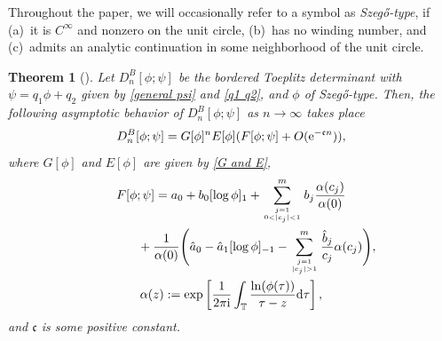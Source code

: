 \documentclass[10pt,a4paper]{amsart}
\numberwithin{equation}{section}
\newtheorem{Theorem}{Theorem}[section]
\newcommand{\T}{{\mathbb T}}
\newcommand{\al}{\alpha}
\begin{document}
\begin{Definition}
Throughout the paper, we will occasionally refer to a symbol as \textit{Szeg\H{o}-type}, if (a)~it is $C^{\infty}$ and nonzero on the unit circle, (b)~has no winding number, and (c)~admits an analytic continuation in some neighborhood of the unit circle.
\end{Definition}

\begin{Theorem}[\cite{BEGIL}]\label{main thm}
	Let $D^{B}_{n}[\phi; \psi]$ be the bordered Toeplitz determinant with $\psi=q_1 \phi + q_2$ given by \eqref{general psi} and \eqref{q1 q2}, and $\phi$ of Szeg\H{o}-type. Then, the following asymptotic behavior of $D^{B}_{n}[\phi; \psi]$ as $n \to \infty$ takes place
	\[%
			D^B_{n}[\phi ; \psi ] =
			G[\phi]^{n} E[\phi](F[\phi;\psi] + O({\rm e}^{-\mathfrak{c}n})),
		\]
		where $G[\phi]$ and $E[\phi]$ are given by \eqref{G and E},
		\begin{gather}
			F[\phi;\psi] =	
			a_0+ b_0 [\log \phi]_{1} +
		\sum^m_{j=1 \atop 0<|c_j|<1} b_j \frac{\al(c_j)}{\alpha(0)}\nonumber\\
			\phantom{F[\phi;\psi] =}{}+	
			\frac{1}{\al(0)}\Bigg(
			\hat{a}_0-\hat{a}_1[\log \phi]_{-1} -
			\sum^{m}_{j=1 \atop |c_j|>1 }\frac{\hat{b}_j}{c_j} \al(c_j) \Bigg),\label{ConstantF2}\\
			\al(z):= \exp \left[ \frac{1}{2 \pi {\rm i} } \int_{\T} \frac{\ln(\phi(\tau))}{\tau-z}{\rm d}\tau \right],\label{al}
		\end{gather}
		and $\mathfrak{c}$ is some positive constant.
	\end{Theorem}
	
\end{document}
